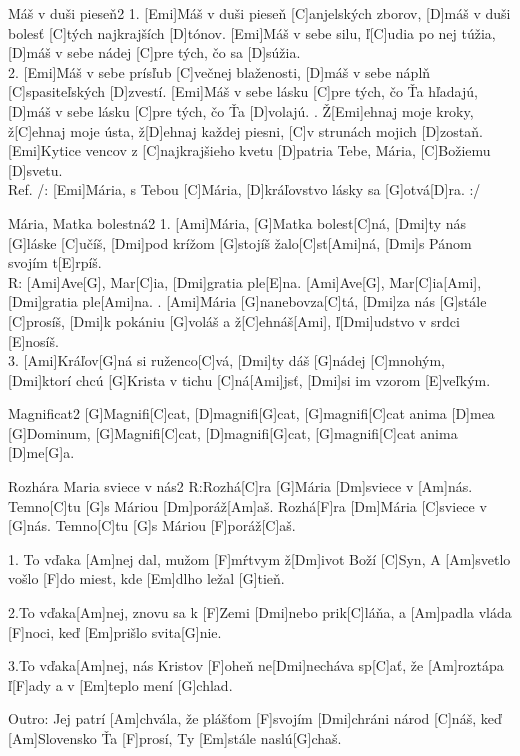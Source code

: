 \documentclass[12pt]{article}
\begin{document}
\begin{song}{Máš v duši pieseň}{2}
	1. [Emi]Máš v duši pieseň [C]anjelských zborov,
	[D]máš v duši bolesť [C]tých najkrajších [D]tónov.
	[Emi]Máš v sebe silu, ľ[C]udia po nej túžia,
	[D]máš v sebe nádej [C]pre tých, čo sa [D]súžia.
	\\
	2. [Emi]Máš v sebe prísľub [C]večnej blaženosti,
	[D]máš v sebe náplň [C]spasiteľských [D]zvestí.
	[Emi]Máš v sebe lásku [C]pre tých, čo Ťa hľadajú,
	[D]máš v sebe lásku [C]pre tých, čo Ťa [D]volajú.
	. Ž[Emi]ehnaj moje kroky, ž[C]ehnaj moje ústa,
	ž[D]ehnaj každej piesni, 
	[C]v strunách mojich [D]zostaň.
	[Emi]Kytice vencov z [C]najkrajšieho kvetu
	[D]patria Tebe, Mária, [C]Božiemu [D]svetu.
	\\
	Ref. 
	/: [Emi]Mária, s Tebou [C]Mária,
	[D]kráľovstvo lásky sa [G]otvá[D]ra. :/
\end{song}

\begin{song}{Mária, Matka bolestná}{2}
	1. [Ami]Mária, [G]Matka bolest[C]ná, 
	[Dmi]ty nás [G]láske [C]učíš,
	[Dmi]pod krížom [G]stojíš žalo[C]st[Ami]ná, 
	[Dmi]s Pánom svojím t[E]rpíš.
	\\
	R: [Ami]Ave[G], Mar[C]ia, 
	[Dmi]gratia ple[E]na. 
	[Ami]Ave[G], Mar[C]ia[Ami], 
	[Dmi]gratia ple[Ami]na.
	. [Ami]Mária [G]nanebovza[C]tá,
	[Dmi]za nás [G]stále [C]prosíš,
	[Dmi]k pokániu [G]voláš a ž[C]ehnáš[Ami], 
	ľ[Dmi]udstvo v srdci [E]nosíš.
	\\
	3. [Ami]Kráľov[G]ná si ruženco[C]vá, 
	[Dmi]ty dáš [G]nádej [C]mnohým,
	[Dmi]ktorí chcú [G]Krista v tichu [C]ná[Ami]jsť, 
	[Dmi]si im vzorom [E]veľkým.
\end{song}

\begin{song}{Magnificat}{2}
	[G]Magnifi[C]cat, [D]magnifi[G]cat,
	[G]magnifi[C]cat anima [D]mea [G]Dominum,
	[G]Magnifi[C]cat, [D]magnifi[G]cat,
	[G]magnifi[C]cat anima [D]me[G]a.
	\columnbreak
\end{song}


\begin{song}{Rozhára Maria sviece v nás}{2}
	R:Rozhá[C]ra [G]Mária [Dm]sviece v [Am]nás.
	Temno[C]tu [G]s Máriou [Dm]poráž[Am]aš.
	Rozhá[F]ra [Dm]Mária [C]sviece v [G]nás.
	Temno[C]tu [G]s Máriou [F]poráž[C]aš.
	
	1. To vďaka [Am]nej dal, mužom [F]mŕtvym ž[Dm]ivot Boží [C]Syn,
	A [Am]svetlo vošlo [F]do miest, kde [Em]dlho ležal [G]tieň.
	
	\columnbreak
	2.To vďaka[Am]nej, znovu sa k [F]Zemi [Dmi]nebo prik[C]láňa,
	a [Am]padla vláda [F]noci, keď [Em]prišlo svita[G]nie.
	
	3.To vďaka[Am]nej, nás Kristov [F]oheň ne[Dmi]necháva sp[C]ať,
	že [Am]roztápa ľ[F]ady a v [Em]teplo mení [G]chlad.
	
	Outro:
	Jej patrí [Am]chvála, že plášťom [F]svojím [Dmi]chráni národ [C]náš,
	keď [Am]Slovensko Ťa [F]prosí, Ty [Em]stále naslú[G]chaš.
\end{song}
\end{document}
